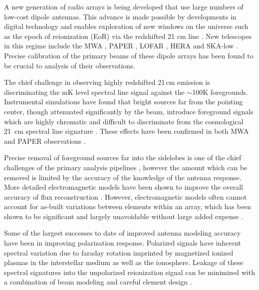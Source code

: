 \documentclass[preprint2,numberedappendix,tighten,twocolappendix]{aastex6}
\begin{document}
A new generation of radio arrays is being developed that use large numbers of low-cost dipole antennas. This advance is made possible by developments in digital technology and enables exploration of new windows on the universe such as the epoch of reionization (EoR) via the redshifted 21 cm line \citep{Morales:2010p8093,Furlanetto:2006p2267,Madau:1997p2232}.  New telescopes in this regime include the MWA \citep{Tingay:2013p9022,Bowman:2013p9950}, PAPER \citep{Pober:2012p8800,2015ApJ...809...61A,2013ApJ...776..108J}, LOFAR \cite{Yatawatta:2013p9699}, HERA \citep{2016:deBoerHERAarxiv} and SKA-low \citep{Mellema:2013p10035,Mort:2016SKAlowimagingarxiv}.   Precise calibration of the primary beams of these dipole arrays has been found to be crucial to analysis of their observations.

The chief challenge in observing highly redshifted 21\,cm emission is discriminating the mK level spectral line signal against the $\sim$100K foregrounds.  Instrumental simulations have found that bright sources far from the pointing center, though attenuated significantly by the beam, introduce foreground signals which are highly chromatic and difficult to discriminate from the cosmological 21~cm spectral line signature \citep{Thyagarajan:2013p10039,2015ApJ...804...14T,Mort:2016SKAlowimagingarxiv}. These effects have been confirmed in both MWA and PAPER observations \citep{2015:ThyagarajanConfirmationwidefield,Pober:2016ApJ...819....8P}. 

Precise removal of foreground sources far into the sidelobes is one of the chief challenges of the primary analysis pipelines  \citep{2016:JacobsPipelinepaper}, however the amount which can be removed is limited by the accuracy of the knowledge of the antenna response.  More detailed electromagnetic models have been shown to improve the overall accuracy of flux reconstruction \citep{Sutinjo:2015RaSc...50...52S}.   However, electromagnetic models often cannot account for as-built variations between elements within an array, which has been shown to be significant and largely unavoidable without large added expense \citep{2016:NebenBeamformingerrors}.  

Some of the largest successes to date of improved antenna modeling accuracy have been in improving polarization response. Polarized signals have inherent spectral variation due to faraday rotation imprinted by magnetized ionized plasmas in the interstellar medium as well as the ionosphere. Leakage of these spectral signatures into the unpolarized reionization signal can be minimized with a combination of beam modeling and careful element design \citep{Jelic:2010p8293,Moore:2013p9941,Asad:2015LofarPol}.
\end{document}
